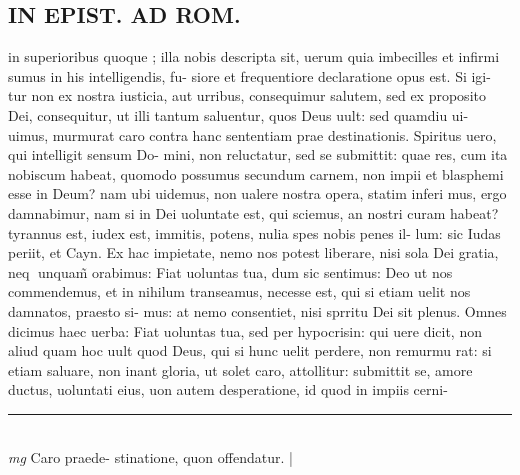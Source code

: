 \documentclass{article}
\begin{document}
\begin{pages}
\section*{IN EPIST. AD ROM.   }
\marginpar{[ p.]}\pstart in superioribus quoque ; illa nobis descripta sit, uerum quia imbecilles et infirmi sumus in his intelligendis, fu- siore et frequentiore declaratione opus est. Si igi- tur non ex nostra iusticia, aut urribus, consequimur salutem, sed ex proposito Dei, consequitur, ut illi tantum saluentur, quos Deus uult: sed quamdiu ui- uimus, murmurat caro contra hanc sententiam prae destinationis. Spiritus uero, qui intelligit sensum Do- mini, non reluctatur, sed se submittit: quae res, cum ita nobiscum habeat, quomodo possumus secundum carnem, non impii et blasphemi esse in Deum? nam ubi uidemus, non ualere nostra opera, statim inferi mus, ergo damnabimur, nam si in Dei uoluntate est, qui sciemus, an nostri curam habeat? tyrannus est, iudex est, immitis, potens, nulia spes nobis penes il- lum: sic Iudas periit, et Cayn. Ex hac impietate, nemo nos potest liberare, nisi sola Dei gratia, neq unquam̃ orabimus: Fiat uoluntas tua, dum sic sentimus: Deo ut nos commendemus, et in nihilum transeamus, necesse est, qui si etiam uelit nos damnatos, praesto si- mus: at nemo consentiet, nisi sprritu Dei sit plenus.  Omnes dicimus haec uerba: Fiat uoluntas tua, sed per hypocrisin: qui uere dicit, non aliud quam hoc uult quod Deus, qui si hunc uelit perdere, non remurmu rat: si etiam saluare, non inant gloria, ut solet caro, attollitur: submittit se, amore ductus, uoluntati eius, uon autem desperatione, id quod in impiis cerni-  \pend
\vspace{0.5cm}\noindent
\vspace{0.2cm}\rule{1cm}{0.2pt}\\ 
\hspace{0.2cm}\textit{mg}
\footnotesize Caro praede- stinatione, quon offendatur.  
\normalsize| 

\end{pages}
\end{document}
